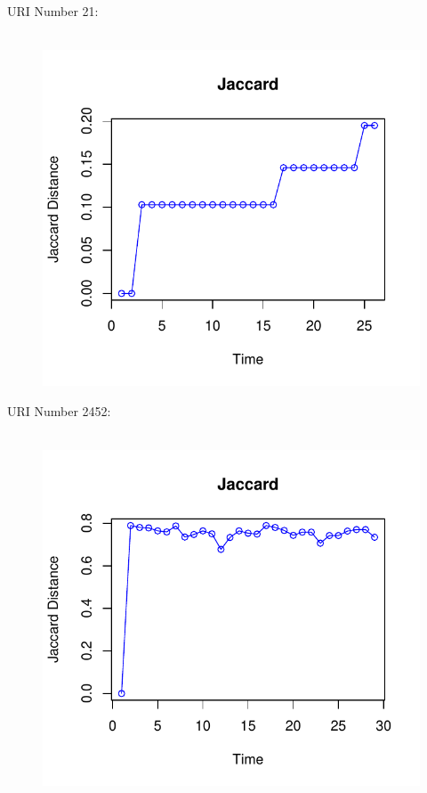 \documentclass[12pt]{article}
\begin{document}
URI Number 21:\\
\begin{figure}[H]
    \centering
    \includegraphics[scale=0.7]{21.pdf}
\end{figure}

URI Number 2452:\\
\begin{figure}[H]
    \centering
    \includegraphics[scale=0.7]{2452.pdf}
\end{figure}
\end{document}
